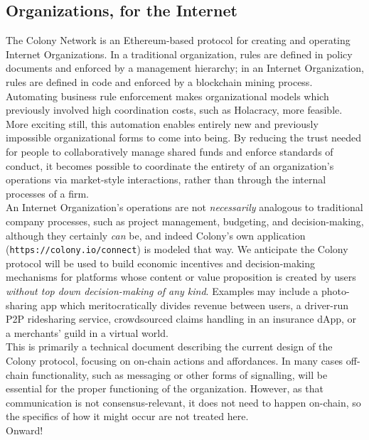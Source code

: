 \subsection*{Organizations, for the Internet}

The Colony Network is an Ethereum-based protocol for creating and operating Internet Organizations. In a traditional organization, rules are defined in policy documents and enforced by a management hierarchy; in an Internet Organization, rules are defined in code and enforced by a blockchain mining process. \\

Automating business rule enforcement makes organizational models which previously involved high coordination costs, such as Holacracy, more feasible. More exciting still, this automation enables entirely new and previously impossible organizational forms to come into being. By reducing the trust needed for people to collaboratively manage shared funds and enforce standards of conduct, it becomes possible to coordinate the entirety of an organization’s operations via market-style interactions, rather than through the internal processes of a firm. \\

An Internet Organization’s operations are not \textit{necessarily} analogous to traditional company processes, such as project management, budgeting, and decision-making, although they certainly \textit{can} be, and indeed Colony’s own application (\texttt{https://colony.io/connect}) is modeled that way. We anticipate the Colony protocol will be used to build economic incentives and decision-making mechanisms for platforms whose content or value proposition is created by users \textit{without top down decision-making of any kind}. Examples may include a photo-sharing app which meritocratically divides revenue between users, a driver-run P2P ridesharing service, crowdsourced claims handling in an insurance dApp, or a merchants’ guild in a virtual world. \\

This is primarily a technical document describing the current design of the Colony protocol, focusing on on-chain actions and affordances. In many cases off-chain functionality, such as messaging or other forms of signalling, will be essential for the proper functioning of the organization. However, as that communication is not consensus-relevant, it does not need to happen on-chain, so the specifics of how it might occur are not treated here. \\

Onward!



